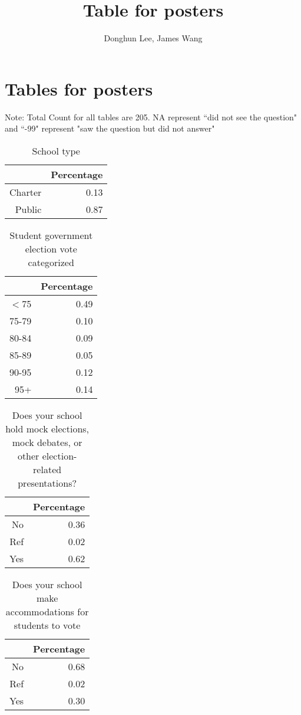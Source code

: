 \documentclass[12pt]{article}
\begin{document}
\title{Table for posters}
\author{Donghun Lee, James Wang}
\maketitle
\section{Tables for posters}
Note: Total Count for all tables are 205. NA represent ``did not see the question" and ``-99" represent "saw the question but did not answer" 

\begin{table}[ht]
\caption {School type}
\centering
\begin{tabular}{rr}
  \hline
 & Percentage \\ 
  \hline
Charter & 0.13 \\ 
  Public & 0.87 \\ 
   \hline
\end{tabular}
\end{table}

\begin{table}[ht]
\caption {Student government election vote categorized}
\centering
\begin{tabular}{rr}
  \hline
 & Percentage \\ 
  \hline
$<$75 & 0.49 \\ 
  75-79 & 0.10 \\ 
  80-84 & 0.09 \\ 
  85-89 & 0.05 \\ 
  90-95 & 0.12 \\ 
  95+ & 0.14 \\ 
   \hline
\end{tabular}
\end{table}

\begin{table}[ht]
\caption {Does your school hold mock elections, mock debates, or other election-related presentations?}
\centering
\begin{tabular}{rr}
  \hline
 & Percentage \\ 
  \hline
No & 0.36 \\ 
  Ref & 0.02 \\ 
  Yes & 0.62 \\ 
   \hline
\end{tabular}
\end{table}

\begin{table}[ht]
\caption {Does your school make accommodations for students to vote}
\centering
\begin{tabular}{rr}
  \hline
 & Percentage \\ 
  \hline
No & 0.68 \\ 
  Ref & 0.02 \\ 
  Yes & 0.30 \\ 
   \hline
\end{tabular}
\end{table}
\end{document}
